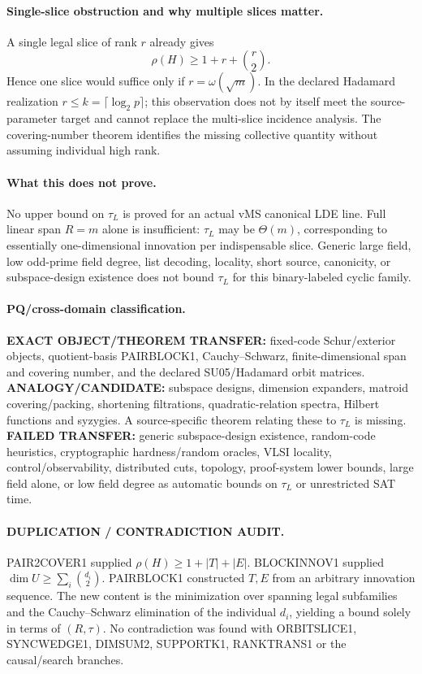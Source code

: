\documentclass[11pt]{article}
\begin{document}
\paragraph{Single-slice obstruction and why multiple slices matter.}
A single legal slice of rank $r$ already gives
\[
\rho(H)\ge1+r+\binom r2.
\]
Hence one slice would suffice only if $r=\omega(\sqrt m)$. In the declared Hadamard realization $r\le k=\lceil\log_2p\rceil$; this observation does not by itself meet the source-parameter target and cannot replace the multi-slice incidence analysis. The covering-number theorem identifies the missing collective quantity without assuming individual high rank.

\paragraph{What this does not prove.}
No upper bound on $\tau_L$ is proved for an actual vMS canonical LDE line. Full linear span $R=m$ alone is insufficient: $\tau_L$ may be $\Theta(m)$, corresponding to essentially one-dimensional innovation per indispensable slice. Generic large field, low odd-prime field degree, list decoding, locality, short source, canonicity, or subspace-design existence does not bound $\tau_L$ for this binary-labeled cyclic family.

\paragraph{PQ/cross-domain classification.}
\textbf{EXACT OBJECT/THEOREM TRANSFER:} fixed-code Schur/exterior objects, quotient-basis PAIRBLOCK1, Cauchy--Schwarz, finite-dimensional span and covering number, and the declared SU05/Hadamard orbit matrices.
\textbf{ANALOGY/CANDIDATE:} subspace designs, dimension expanders, matroid covering/packing, shortening filtrations, quadratic-relation spectra, Hilbert functions and syzygies. A source-specific theorem relating these to $\tau_L$ is missing.
\textbf{FAILED TRANSFER:} generic subspace-design existence, random-code heuristics, cryptographic hardness/random oracles, VLSI locality, control/observability, distributed cuts, topology, proof-system lower bounds, large field alone, or low field degree as automatic bounds on $\tau_L$ or unrestricted SAT time.

\paragraph{DUPLICATION / CONTRADICTION AUDIT.}
PAIR2COVER1 supplied $\rho(H)\ge1+|T|+|E|$. BLOCKINNOV1 supplied $\dim U\ge\sum_i\binom{d_i}{2}$. PAIRBLOCK1 constructed $T,E$ from an arbitrary innovation sequence. The new content is the minimization over spanning legal subfamilies and the Cauchy--Schwarz elimination of the individual $d_i$, yielding a bound solely in terms of $(R,\tau)$. No contradiction was found with ORBITSLICE1, SYNCWEDGE1, DIMSUM2, SUPPORTK1, RANKTRANS1 or the causal/search branches.
\end{document}
